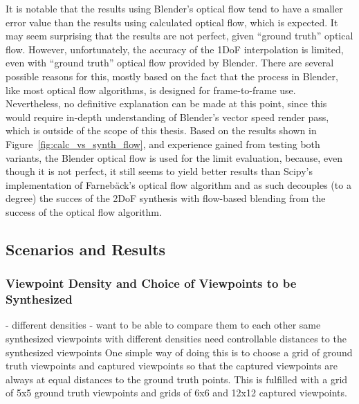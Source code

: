 It is notable that the results using Blender's optical flow tend to have a smaller error value than the results using calculated optical flow, which is expected. It may seem surprising that the results are not perfect, given ``ground truth'' optical flow. However, unfortunately, the accuracy of the 1DoF interpolation is limited, even with ``ground truth'' optical flow provided by Blender. There are several possible reasons for this, mostly based on the fact that the process in Blender, like most optical flow algorithms, is designed for frame-to-frame use. Nevertheless, no definitive explanation can be made at this point, since this would require in-depth understanding of Blender's vector speed render pass, which is outside of the scope of this thesis. Based on the results shown in Figure~\ref{fig:calc_vs_synth_flow}, and experience gained from testing both variants, the Blender optical flow is used for the limit evaluation, because, even though it is not perfect, it still seems to yield better results than Scipy's implementation of Farneb\"ack's optical flow algorithm and as such decouples (to a degree) the succes of the 2DoF synthesis with flow-based blending from the success of the optical flow algorithm.


\subsection{Scenarios and Results}

\subsubsection{Viewpoint Density and Choice of Viewpoints to be Synthesized}
- different densities
- want to be able to compare them to each other \ar same synthesized viewpoints with different densities \ar need controllable distances to the synthesized viewpoints
One simple way of doing this is to choose a grid of ground truth viewpoints and captured viewpoints so that the captured viewpoints are always at equal distances to the ground truth points. This is fulfilled with a grid of 5x5 ground truth viewpoints and grids of 6x6 and 12x12 captured viewpoints.


